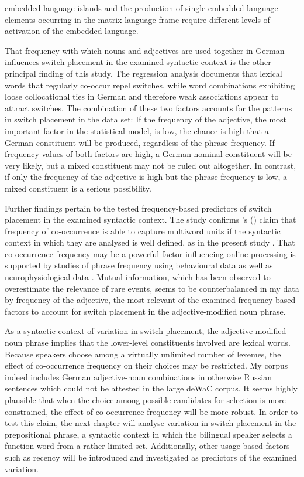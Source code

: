 embedded-language islands and the production of single embedded-language elements occurring in the matrix language frame require different levels of activation of the embedded language.

That frequency with which nouns and adjectives are used together in German influences switch placement in the examined syntactic context is the other principal finding of this study. The regression analysis documents that lexical words that regularly co-occur repel switches, while word combinations exhibiting loose collocational ties in German and therefore weak associations appear to attract switches. The combination of these two factors accounts for the patterns in switch placement in the data set: If the frequency of the adjective, the most important factor in the statistical model, is low, the chance is high that a German constituent will be produced, regardless of the phrase frequency. If frequency values of both factors are high, a German nominal constituent will be very likely, but a mixed constituent may not be ruled out altogether. In contrast, if only the frequency of the adjective is high but the phrase frequency is low, a mixed constituent is a serious possibility.

Further findings pertain to the tested frequency-based predictors of switch placement in the examined syntactic context. The study confirms \citeauthor{heylen-2014}'s (\citeyear{heylen-2014}) claim that frequency of co-occurrence is able to capture multiword units if the syntactic context in which they are analysed is well defined, as in the present study \citep[see also][]{schneider2014}. That co-occurrence frequency may be a powerful factor influencing online processing is supported by studies of phrase frequency using behavioural data \citep{arnon-snider,janssen-barber} as well as neurophysiological data \citep{tremblay-baayen}. Mutual information, which has been  observed to overestimate the relevance of rare events, seems to be counterbalanced in my data by frequency of the adjective, the most relevant of the examined frequency-based factors to account for switch placement in the adjective-modified noun phrase.

As a syntactic context of variation in switch placement, the adjective-modified noun phrase implies that the lower-level constituents involved are lexical words. Because speakers choose among a virtually unlimited number of lexemes, the effect of co-occurrence frequency on their choices may be restricted. My corpus indeed includes German adjective-noun combinations in otherwise Russian sentences which could not be attested in the large deWaC corpus. It seems highly plausible that when the choice among possible candidates for selection is more constrained, the effect of co-occurrence frequency will be more robust. In order to test this claim, the next chapter will analyse variation in switch placement in the prepositional phrase, a syntactic context in which the bilingual speaker selects a function word from a rather limited set. Additionally, other usage-based factors such as recency will be introduced and investigated as predictors of the examined variation.
